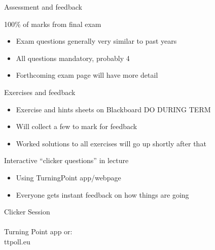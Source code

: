 \documentclass{beamer}
\begin{document}
\begin{frame}{Assessment and feedback}
  \begin{block}{100\% of marks from final exam}
\begin{itemize}
\item Exam questions generally very similar to past years
\item All questions mandatory, probably 4
  \item Forthcoming exam page will have more detail
\end{itemize}
  \end{block}
  \begin{block}{Exercises and feedback}
    \begin{itemize}
    \item Exercise and hints sheets on Blackboard \alert{DO DURING TERM}
    \item Will collect a few to mark for feedback
    \item Worked solutions to all exercises will go up shortly after that
            \end{itemize}
  \end{block}
  \begin{block}{Interactive ``clicker questions'' in lecture}
\begin{itemize}
\item    Using TurningPoint app/webpage 
\item Everyone gets instant feedback on how things are going
\end{itemize}
\end{block}
\end{frame}

\begin{frame}[plain,c]

\begin{center}

\Huge

Clicker Session \\
\\
Turning Point app or:
\\
ttpoll.eu 

\end{center}





\end{frame}
\end{document}
